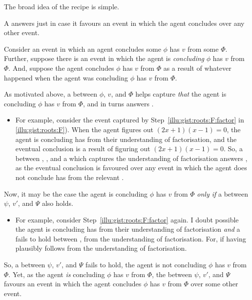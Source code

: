 \begin{note}
  The broad idea of the recipe is simple.

  A \ros{} answers \qWhy{} just in case it favours an event in which the agent concludes over any other event.

  Consider an event in which an agent concludes some  \(\phi\) has \val{} \(v\) from some \pool{} \(\Phi\).
  Further, suppose there is an event in which the agent is \emph{concluding} \(\phi\) has \val{} \(v\) from \(\Phi\).
  And, suppose the agent concludes \(\phi\) has \val{} \(v\) from \(\Phi\) as a result of whatever happened when the agent was concluding \(\phi\) has \val{} \(v\) from \(\Phi\).

  As motivated above, a \ros{} between \(\phi\), \(v\), and \(\Phi\) helps capture \emph{that} the agent is concluding \(\phi\) has  \(v\) from \(\Phi\), and in turns answers \qWhy{}.
  \begin{itemize}
  \item
    For example, consider the event captured by Step~\ref{illu:gist:roots:F:factor} in \autoref{illu:gist:roots:F}).
  When the agent figures out \((2x + 1)(x - 1) = 0\), the agent is concluding \propI{\rootsCon{}} has   from their understanding of factorisation, and the eventual conclusion is a result of figuring out \((2x + 1)(x - 1) = 0\).
  So, a \ros{} between \propI{\rootsCon{}}, , and a \pool{} which captures the \agents{} understanding of factorisation answers \qWhy{}, as the \agents{} eventual conclusion is favoured over any event in which the agent does not conclude \propI{\rootsCon{}} has   from the relevant \pool{}.
  \end{itemize}
  Now, it may be the case the agent is concluding \(\phi\) has  \(v\) from \(\Phi\) \emph{only if} a \ros{} between \(\psi\), \(v'\), and \(\Psi\) also holds.
  \begin{itemize}
  \item
    For example, consider Step~\ref{illu:gist:roots:F:factor} again.
    I doubt possible the agent is concluding \propI{\rootsCon{}} has   from their understanding of factorisation \emph{and} a \ros{} fails to hold between \propI{\rootsSimp{}},   from the \agents{} understanding of factorisation.
    For, if \propI{\rootsSimp{}} having   plausibly follows from the \agents{} understanding of factorisation.
  \end{itemize}
  So, a \ros{} between \(\psi\), \(v'\), and \(\Psi\) fails to hold, the agent is not concluding \(\phi\) has  \(v\) from \(\Phi\).
  Yet, as the agent \emph{is} concluding \(\phi\) has  \(v\) from \(\Phi\), the \ros{} between \(\psi\), \(v'\), and \(\Psi\) favours an event in which the agent concludes \(\phi\) has  \(v\) from \(\Phi\) over some other event.


\end{note}
